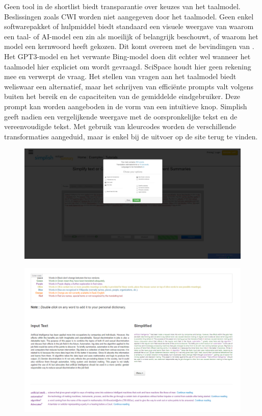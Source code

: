 Geen tool in de shortlist biedt transparantie over keuzes van het taalmodel. Beslissingen zoals CWI worden niet aangegeven door het taalmodel. Geen enkel softwarepakket of hulpmiddel biedt standaard een visuele weergave van waarom een taal- of AI-model een zin als moeilijk of belangrijk beschouwt, of waarom het model een kernwoord heeft gekozen. Dit komt overeen met de bevindingen van \textcite{Gooding2019}. Het GPT3-model en het verwante Bing-model doen dit echter wel wanneer het taalmodel hier expliciet om wordt gevraagd. SciSpace houdt hier geen rekening mee en verwerpt de vraag. Het stellen van vragen aan het taalmodel biedt weliswaar een alternatief, maar het schrijven van efficiënte prompts valt volgens \textcite{} buiten het bereik en de capaciteiten van de gemiddelde eindgebruiker. Deze prompt kan worden aangeboden in de vorm van een intuïtieve knop. Simplish geeft nadien een vergelijkende weergave met de oorspronkelijke tekst en de vereenvoudigde tekst. Met gebruik van kleurcodes worden de verschillende transformaties aangeduid, maar is enkel bij de uitvoer op de site terug te vinden.

\begin{figure}[H]
	\includegraphics[width=\linewidth]{img/simplish-input.png}
\end{figure}

\begin{figure}[H]
	\includegraphics[width=\linewidth]{img/simplish-output.png}
\end{figure}

